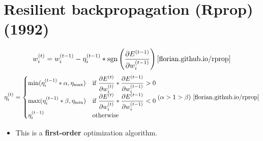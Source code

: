 \section{Resilient backpropagation (Rprop) (1992) \cite{wiki-Rprop,pytorch-Rprop,florian.github.io/rprop}}\label{Resilient backpropagation (Rprop)}

\[
    \displaystyle w_i^{(t)} = w_i^{(t - 1)} - \eta_i^{(t - 1)} * \operatorname{sgn}\left(\dfrac{\partial E^{(t -
    1)}}{\partial w_i^{(t - 1)}}\right)
    \hfill
    \text{\cite{florian.github.io/rprop}}
\]
\[
    \displaystyle \eta_i^{(t)} = \begin{cases}
    \min(\eta_i^{(t - 1)} * \alpha, \eta_{\max}) & \text{if } \displaystyle\dfrac{\partial E^{(t)}}{\partial w_i^{(t)}} * \displaystyle\dfrac{\partial E^{(t - 1)}}{\partial w_i^{(t - 1)}} > 0 \\
    \max(\eta_i^{(t - 1)} * \beta, \eta_{\min}) & \text{if } \displaystyle\dfrac{\partial E^{(t)}}{\partial w_i^{(t)}} * \displaystyle\dfrac{\partial E^{(t - 1)}}{\partial w_i^{(t - 1)}} < 0 \\
    \eta_i^{(t - 1)} & \text{otherwise}
    \end{cases}
    \hfill
    (\alpha > 1 > \beta) \text{ \cite{florian.github.io/rprop}}
\]


\begin{itemize}
    \item This is a \textbf{first-order} optimization algorithm.
\end{itemize}

